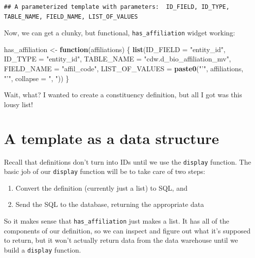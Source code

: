\documentclass[]{book}
\newenvironment{Shaded}{\begin{snugshade}}{\end{snugshade}}
\newcommand{\ControlFlowTok}[1]{\textcolor[rgb]{0.13,0.29,0.53}{\textbf{#1}}}
\newcommand{\DataTypeTok}[1]{\textcolor[rgb]{0.13,0.29,0.53}{#1}}
\newcommand{\KeywordTok}[1]{\textcolor[rgb]{0.13,0.29,0.53}{\textbf{#1}}}
\newcommand{\NormalTok}[1]{#1}
\newcommand{\StringTok}[1]{\textcolor[rgb]{0.31,0.60,0.02}{#1}}
\providecommand{\tightlist}{%
  \setlength{\itemsep}{0pt}\setlength{\parskip}{0pt}}
\begin{document}
\begin{verbatim}
## A parameterized template with parameters:  ID_FIELD, ID_TYPE, TABLE_NAME, FIELD_NAME, LIST_OF_VALUES
\end{verbatim}

Now, we can get a clunky, but functional, \texttt{has\_affiliation} widget working:

\begin{Shaded}
\begin{Highlighting}[]
\NormalTok{has_affiliation <-}\StringTok{ }\ControlFlowTok{function}\NormalTok{(affiliations) \{}
    \KeywordTok{list}\NormalTok{(}\DataTypeTok{ID_FIELD =} \StringTok{"entity_id"}\NormalTok{,}
         \DataTypeTok{ID_TYPE =} \StringTok{"entity_id"}\NormalTok{,}
         \DataTypeTok{TABLE_NAME =} \StringTok{"cdw.d_bio_affiliation_mv"}\NormalTok{,}
         \DataTypeTok{FIELD_NAME =} \StringTok{"affil_code"}\NormalTok{,}
         \DataTypeTok{LIST_OF_VALUES =} \KeywordTok{paste0}\NormalTok{(}\StringTok{"'"}\NormalTok{, affiliations, }\StringTok{"'"}\NormalTok{,}
                                \DataTypeTok{collapse =} \StringTok{", "}\NormalTok{))}
\NormalTok{\}}
\end{Highlighting}
\end{Shaded}

Wait, what? I wanted to create a constituency definition, but all I got was this lousy list!

\hypertarget{a-template-as-a-data-structure}{%
\section{A template as a data structure}\label{a-template-as-a-data-structure}}

Recall that definitions don't turn into IDs until we use the \texttt{display} function. The basic job of our \texttt{display} function will be to take care of two steps:

\begin{enumerate}
\def\labelenumi{\arabic{enumi}.}
\tightlist
\item
  Convert the definition (currently just a list) to SQL, and
\item
  Send the SQL to the database, returning the appropriate data
\end{enumerate}

So it makes sense that \texttt{has\_affiliation} just makes a list. It has all of the components of our definition, so we can inspect and figure out what it's supposed to return, but it won't actually return data from the data warehouse until we build a \texttt{display} function.
\end{document}
